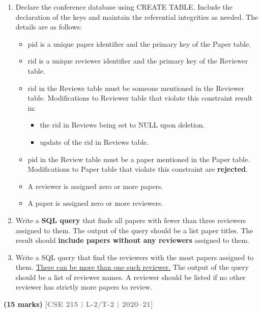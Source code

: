 \documentclass[12pt,a3paper]{article}
\newcommand{\yr}[1]{\hfill\textcolor{gray}{\small\textbf{[#1]}}}
\newcommand{\mk}[1]{\textcolor{orange!70!black}{\small\textbf{(#1 marks)}}}
\begin{document}
\begin{enumerate}
\begin{enumerate}[label=\roman*.]
    \item Declare the conference database using CREATE TABLE. Include the declaration of the keys and maintain the referential integrities as needed. The details are as follows:
    \begin{itemize}
        \item pid is a unique paper identifier and the primary key of the Paper table.
        \item rid is a unique reviewer identifier and the primary key of the Reviewer table.
        \item rid in the Reviews table must be someone mentioned in the Reviewer table. Modifications to Reviewer table that violate this constraint result in:
        \begin{itemize}
            \item[*] the rid in Reviews being set to NULL upon deletion.
            \item[*] update of the rid in Reviews table.
        \end{itemize}
        \item pid in the Review table must be a paper mentioned in the Paper table. Modifications to Paper table that violate this constraint are \textbf{rejected}.
        \item A reviewer is assigned zero or more papers.
        \item A paper is assigned zero or more reviewers.
    \end{itemize}
    
    \item Write a \textbf{SQL query} that finds all papers with fewer than three reviewers assigned to them. The output of the query should be a list paper titles. The result should \textbf{include papers without any reviewers} assigned to them.
    
    \item Write a SQL query that find the reviewers with the most papers assigned to them. \underline{There can be more than one such reviewer.} The output of the query should be a list of reviewer names. A reviewer should be listed if no other reviewer has strictly more papers to review.
\end{enumerate}
\mk{15} \yr{CSE 215 | L-2/T-2 | 2020--21}


\end{enumerate}
\end{document}
